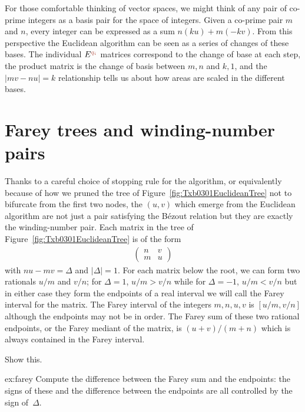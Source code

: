 For those comfortable thinking of vector spaces,  we might think of any pair of co-prime integers as a basis pair for the space of integers.  Given a co-prime pair $m$ and $n$, every integer can be expressed as a sum $n (k u)+ m (-k v)$.  From this perspective the Euclidean algorithm  can  be seen as a series of changes of these bases.  The individual $E^{\jqi}$ matrices correspond to the change of base at each step, the product matrix is the change of basis between $m,n$ and $k,1$, and the $ |mv - nu|=k$ relationship tells us about how areas are scaled in the different bases. 

\section{Farey trees and winding-number pairs}
\label{sec:farey}
Thanks to a careful choice of stopping rule for the algorithm, or equivalently because of how we pruned the tree of Figure~\ref{fig:Txb0301EuclideanTree} not to bifurcate from the first two nodes, the $(u,v)$ which emerge from the Euclidean algorithm are not just a pair satisfying the B\'ezout relation but they are exactly the winding-number pair.
%
Each matrix in the tree of Figure~\ref{fig:Txb0301EuclideanTree} is of the form
\begin{align*}
	\begin{pmatrix} 
		n & v
		\\
		m & u
	\end{pmatrix}
\end{align*}
with $nu-mv=\Delta$ and $|\Delta|=1$. For each matrix below the root, we can form two rationals $u/m$ and $v/n$; for  $\Delta=1$, $u/m>v/n$ while for $\Delta=-1$, $u/m<v/n$ but in either case they form the endpoints of a real interval we will call the Farey interval for the matrix. 
The Farey interval of the integers $m, n, u, v$ is $[u/m,v/n]$ although the endpoints may not be in order. 
The Farey sum of these two rational endpoints, or the Farey mediant of the matrix, is $(u+v)/(m+n)$ which is always contained in the Farey interval.
\begin{jExercise}\label{ex:farey}
	Show this.
\end{jExercise}
\begin{jAnswer}{ex:farey}{
	Compute the difference between the Farey sum and the endpoints: the signs of these and the difference between the endpoints are all controlled by the sign of~$\Delta$. 
}
\end{jAnswer}

